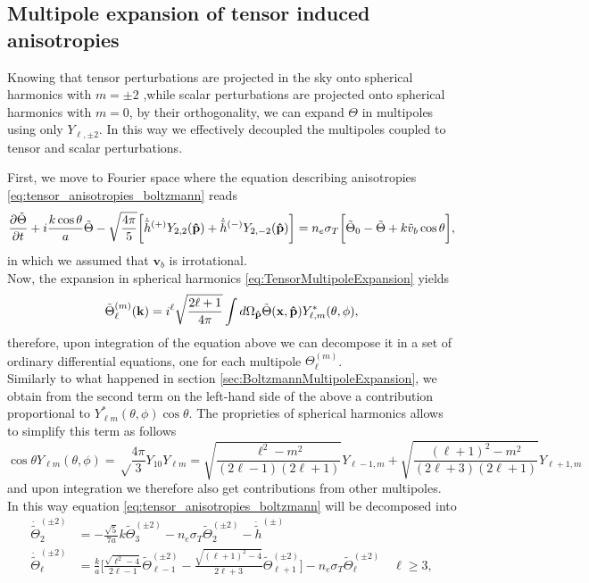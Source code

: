 \subsection{Multipole expansion of tensor induced anisotropies}
Knowing that tensor perturbations are projected in the sky onto spherical harmonics with $m=\pm2$ ,while scalar perturbations are projected onto spherical harmonics with $m=0$, by their orthogonality, we can expand $\Theta$ in multipoles using only $Y_{\ell,\pm2}$. In this way we effectively decoupled the multipoles coupled to tensor and scalar perturbations.

First, we move to Fourier space where the equation describing anisotropies \eqref{eq:tensor_anisotropies_boltzmann} reads
$$\frac{\partial\tilde \Theta}{\partial t}+i\frac{k\cos\theta}{a} \tilde\Theta-\sqrt{\frac{4\pi}{5}}\bigg[\dot{\tilde{h}}^{(+)}Y_{2,2}(\mathbf{\hat{p}})+\dot{\tilde{h}}^{(-)}Y_{2,-2}(\mathbf{\hat{p}})\bigg]=n_{e}\sigma_T\bigg[\tilde\Theta_0-\tilde\Theta+k\tilde v_{b}\cos\theta\bigg],$$ in which we assumed that $\mathbf{v}_b$ is irrotational. \\Now, the expansion in spherical harmonics \eqref{eq:TensorMultipoleExpansion} yields 
$$\tilde{\Theta}_{\ell}^{(m)}(\mathbf{k})=i^\ell\sqrt{\frac{2\ell+1}{4\pi}}\int d\Omega_{\mathbf{\hat{p}}}\tilde\Theta(\mathbf{x},\mathbf{\hat{p}})Y_{\ell,m}^*(\theta,\phi),$$
therefore, upon integration of the equation above we can decompose it in a set of ordinary differential equations, one for each multipole $\Theta_\ell^{(m)}$.\\
Similarly to what happened in section \ref{sec:BoltzmannMultipoleExpansion}, we obtain from the second term on the left-hand side of the above a contribution proportional to $Y^*_{\ell m}(\theta,\phi)\cos\theta$. The proprieties of spherical harmonics allows to simplify this term as follows
$$
\cos\theta Y_{\ell m}(\theta,\phi)=\sqrt\frac{4\pi}{3}Y_{10}Y_{\ell m}=\sqrt{\frac{\ell^2-m^2}{(2\ell-1)(2\ell+1)}}Y_{\ell-1,m}+\sqrt{\frac{(\ell+1)^2-m^2}{(2\ell+3)(2\ell+1)}}Y_{\ell+1,m}
$$  and upon integration we therefore also get contributions from other multipoles.\\In this way equation \eqref{eq:tensor_anisotropies_boltzmann}
will be decomposed into
\begin{subequations}
    \begin{align}
    \dot{\tilde\Theta}_2^{(\pm2)}&=-\frac{\sqrt{5}}{7a}k\tilde\Theta_3^{(\pm2)}-n_e\sigma_T\tilde\Theta_{2}^{(\pm2)}-\dot{\tilde h}^{(\pm)}\quad \\
    \dot{\tilde\Theta}_\ell^{(\pm2)}&=\frac{k}{a}\bigg[\frac{\sqrt{\ell^2-4}}{2\ell-1}\tilde\Theta_{\ell-1}^{(\pm2)}-\frac{\sqrt{(\ell+1)^2-4}}{2\ell+3}\tilde\Theta_{\ell+1}^{(\pm2)}\bigg]-n_e\sigma_T\tilde\Theta_{\ell}^{(\pm2)}\quad \ell\geq3,
\end{align}
\end{subequations}

